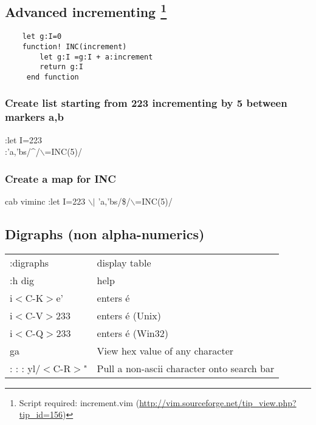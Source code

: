 \documentclass[10pt]{article}
\newenvironment{code}
{\begin{list}{}{\setlength{\leftmargin}{1em}}\item\scriptsize\bfseries}
{\end{list}}
\begin{document}
\subsection*{Advanced incrementing \footnote{Script required: increment.vim (\url{http://vim.sourceforge.net/tip\_view.php?tip\_id=156})}}

\begin{code}

\begin{verbatim}
    let g:I=0
    function! INC(increment)
        let g:I =g:I + a:increment
        return g:I
     end function
\end{verbatim}
\end{code}

\subsubsection*{Create list starting from 223 incrementing by 5 between markers a,b}
:let I=223\\
:'a,'bs/\^{}/$\backslash$=INC(5)/

\subsubsection*{Create a map for INC}
cab viminc :let I=223 $\backslash$$|$ 'a,'bs/\$/$\backslash$=INC(5)/

\subsection*{Digraphs (non alpha-numerics)}
\begin{center}
\begin{longtable}{l|l}
:digraphs                         & display table\\
:h dig                            & help\\
i$<$C-K$>$e'                      & enters é\\
i$<$C-V$>$233                     & enters é (Unix)\\
i$<$C-Q$>$233                     & enters é (Win32)\\
ga                                & View hex value of any character\\
:%
:%
:%
yl/$<$C-R$>$" &  Pull a non-ascii character onto search bar
\end{longtable}
\end{center}
\end{document}
